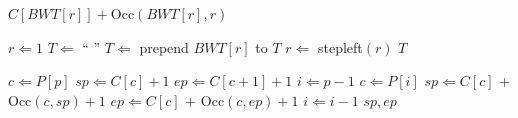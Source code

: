 \documentclass{article}
\begin{document}
\newcommand{\stepleft}{\ensuremath{\mbox{\sc stepleft}}}
\newcommand{\unpermute}{\ensuremath{\mbox{\sc unpermute}}}
\newcommand{\exactmatch}{\ensuremath{\mbox{\sc exactmatch}}}

\begin{algorithm}[stepleft]
\caption{$\stepleft(r)$}\label{alg:stepleft} 
\begin{algorithmic}[1] 
\RETURN $C[BWT[r]] + $Occ$(BWT[r], r)$
\end{algorithmic} 
\end{algorithm} 

\begin{algorithm}[unpermute]
\caption{$\unpermute$}\label{alg:unpermute} 
\begin{algorithmic}[1] 
\STATE $r \Leftarrow 1$
\STATE $T \Leftarrow $ `` ''
\STATE $T \Leftarrow $ prepend $BWT[r]$ to $T$
\STATE $r \Leftarrow $ {\sc stepleft}$(r)$
\ENDWHILE
\RETURN $T$
\end{algorithmic} 
\end{algorithm} 

\begin{algorithm}[exactmatch]
\caption{$\exactmatch(P[1,p])$}\label{alg:exactmatch} 
\begin{algorithmic}[1] 
\STATE $c \Leftarrow P[p]$
\STATE $sp \Leftarrow C[c]+1$
\STATE $ep \Leftarrow C[c+1]+1$
\STATE $i \Leftarrow p - 1$
\STATE $c \Leftarrow P[i]$
\STATE $sp \Leftarrow C[c]$ + Occ$(c, sp) + 1$
\STATE $ep \Leftarrow C[c]$ + Occ$(c, ep) + 1$
\STATE $i \Leftarrow i-1$
\ENDWHILE
\RETURN $sp, ep$
\end{algorithmic} 
\end{algorithm} 
\end{document}
